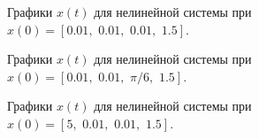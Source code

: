 \begin{figure}[!h]
	\caption{Графики $x(t)$ для нелинейной системы при $x(0)=[0.01, \, \, 0.01, \, \, 0.01, \, \, 1.5]$.}
	\label{6_lqr_n2}
\end{figure}

\begin{figure}[!h]
	\caption{Графики $x(t)$ для нелинейной системы при $x(0)=[0.01, \, \, 0.01, \, \, \pi / 6, \, \, 1.5]$.}
	\label{6_lqr_n3}
\end{figure}

\begin{figure}[!h]
	\caption{Графики $x(t)$ для нелинейной системы при $x(0)=[5, \, \, 0.01, \, \, 0.01, \, \, 1.5]$.}
	\label{6_lqr_n4}
\end{figure}

